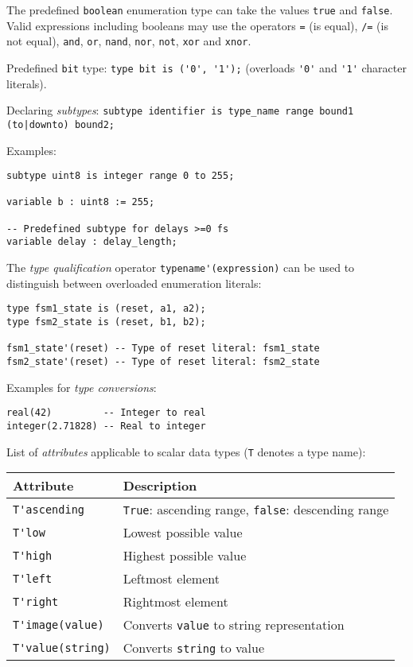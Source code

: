 \documentclass[fontsize=11pt,a4paper]{scrartcl}
\begin{document}
The predefined \lstinline!boolean! enumeration type can take the values \lstinline!true! and \lstinline!false!. Valid expressions including booleans may use the operators \lstinline!=! (is equal), \lstinline!/=! (is not equal), \lstinline!and!, \lstinline!or!, \lstinline!nand!, \lstinline!nor!, \lstinline!not!, \lstinline!xor! and \lstinline!xnor!.

Predefined \lstinline!bit! type: \lstinline!type bit is ('0', '1');! (overloads \lstinline!'0'! and \lstinline!'1'! character literals).

Declaring \emph{subtypes}: \lstinline!subtype identifier is type_name range bound1 (to|downto) bound2;!

Examples:
\begin{lstlisting}
subtype uint8 is integer range 0 to 255;

variable b : uint8 := 255;

-- Predefined subtype for delays >=0 fs
variable delay : delay_length;
\end{lstlisting}

The \emph{type qualification} operator \lstinline!typename'(expression)! can be used to distinguish between overloaded enumeration literals:
\begin{lstlisting}
type fsm1_state is (reset, a1, a2);
type fsm2_state is (reset, b1, b2);

fsm1_state'(reset) -- Type of reset literal: fsm1_state
fsm2_state'(reset) -- Type of reset literal: fsm2_state
\end{lstlisting}

Examples for \emph{type conversions}:
\begin{lstlisting}
real(42)         -- Integer to real
integer(2.71828) -- Real to integer
\end{lstlisting}

List of \emph{attributes} applicable to scalar data types (\lstinline!T! denotes a type name):

\begin{tabular}{ll}
\toprule
	\textbf{Attribute} & \textbf{Description}\\
\midrule
	\lstinline!T'ascending! & \lstinline!True!: ascending range, \lstinline!false!: descending range \\
	\lstinline!T'low! & Lowest possible value\\
	\lstinline!T'high! & Highest possible value\\
	\lstinline!T'left! & Leftmost element\\
	\lstinline!T'right! & Rightmost element\\
	\lstinline!T'image(value)! & Converts \lstinline!value! to string representation\\
	\lstinline!T'value(string)! & Converts \lstinline!string! to value\\
\bottomrule
\end{tabular}
\end{document}
